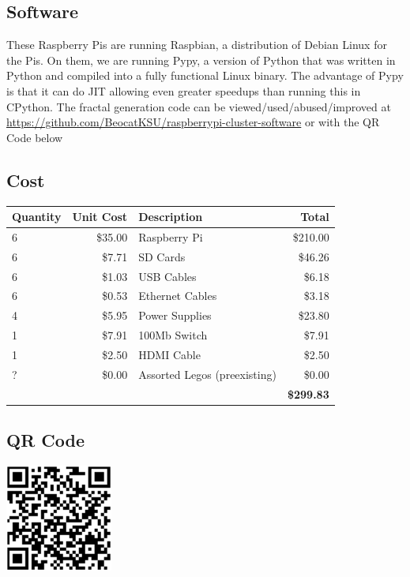 \documentclass[letterpaper,10pt]{article}
\begin{document}
    \subsection{Software}
      These Raspberry Pis are running Raspbian, a distribution of Debian Linux for the Pis.
      On them, we are running Pypy, a version of Python that was written in Python and compiled into a fully functional Linux binary.
      The advantage of Pypy is that it can do JIT allowing even greater speedups than running this in CPython.
      The fractal generation code can be viewed/used/abused/improved at \url{https://github.com/BeocatKSU/raspberrypi-cluster-software} or with the QR Code below

    \subsection{Cost}
      \begin{center}
        \begin{tabular}{|l|r|l|r|}
          \hline
          \textbf{Quantity}&\textbf{Unit Cost}&\textbf{Description}&\textbf{Total}\\
          \hline
          6&\$35.00&Raspberry Pi&\$210.00\\
          6&\$7.71&SD Cards&\$46.26\\
          6&\$1.03&USB Cables&\$6.18\\
          6&\$0.53&Ethernet Cables&\$3.18\\
          4&\$5.95&Power Supplies&\$23.80\\
          1&\$7.91&100Mb Switch&\$7.91\\
          1&\$2.50&HDMI Cable&\$2.50\\
          ?&\$0.00&Assorted Legos (preexisting)&\$0.00\\
          \hline
	  &&&\textbf{\$299.83}\\
          \hline
        \end{tabular}
      \end{center}

    \subsection{QR Code}
      \begin{center}
        \includegraphics[width=100pt]{qrcode.png}
      \end{center}
\end{document}
